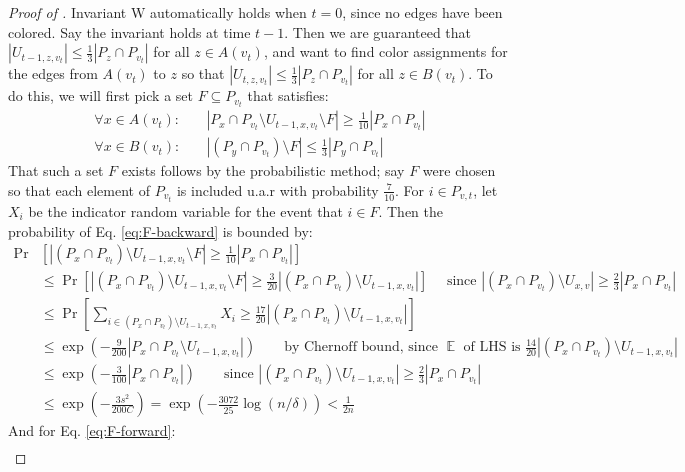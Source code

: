 \documentclass[10pt]{article}
\theoremstyle{definition}\newtheorem{definition}[lemma]{Definition}
\theoremstyle{remark}  \newtheorem*{remark}{Remark}
\DeclareMathOperator{\EE}{\mathbb{E}}
\begin{document}
\begin{proof}[Proof of ]
  Invariant W automatically holds when $t = 0$, since no edges have been colored. Say the invariant holds at time $t - 1$. Then we are guaranteed that $|U_{t-1,z,v_t}| \le \frac{1}{3} |P_z \cap P_{v_t}|$ for all $z \in A(v_t)$, and want to find color assignments for the edges from $A(v_t)$ to $z$ so that $|U_{t,z,v_t}| \le \frac{1}{3} |P_z \cap P_{v_t}|$ for all $z \in B(v_t)$. To do this, we will first pick a set $F \subseteq P_{v_t}$ that satisfies:
  \begin{align}
    \forall x \in A(v_t):&\quad |P_x \cap P_{v_t} \setminus U_{t-1,x,v_t} \setminus F| \ge \frac{1}{10} |P_x \cap P_{v_t}| \label{eq:F-backward} \\
    \forall x \in B(v_t):&\quad |(P_y \cap P_{v_t}) \setminus F| \le \frac{1}{3} |P_y \cap P_{v_t}| \label{eq:F-forward} 
  \end{align}
  That such a set $F$ exists follows by the probabilistic method; say $F$ were chosen so that each element of $P_{v_t}$ is included u.a.r with probability $\frac{7}{10}$. For $i \in P_{v,t}$, let $X_i$ be the indicator random variable for the event that $i \in F$. Then the probability of Eq. \ref{eq:F-backward} is bounded by:
  \begin{align*}
    \Pr&\left[ |(P_x \cap P_{v_t}) \setminus U_{t-1,x,v_t} \setminus F| \ge \frac{1}{10} |P_x \cap P_{v_t}| \right] \\
      &\le   \Pr\left[ |(P_x \cap P_{v_t}) \setminus U_{t-1,x,v_t} \setminus F|      \ge \frac{3}{20} |(P_x \cap P_{v_t}) \setminus U_{t-1,x,v_t}| \right] \quad \text{ since $|(P_x \cap P_{v_t}) \setminus U_{x,v}| \ge \frac{2}{3} |P_x \cap  P_{v_t}|$ } \\
      &\le \Pr\left[ \sum_{i \in (P_x \cap P_{v_t}) \setminus U_{t-1,x,v_t}} X_i \ge \frac{17}{20} |(P_x \cap P_{v_t}) \setminus U_{t-1,x,v_t}| \right] \\
      &\le \exp\left(- \frac{9}{200} |P_x \cap P_{v_t} \setminus U_{t-1,x,v_t}| \right) \qquad \text{by Chernoff bound, since $\EE$ of LHS is $\frac{14}{20} |(P_x \cap P_{v_t}) \setminus U_{t-1,x,v_t}|$} \\
      &\le \exp\left(- \frac{3}{100} |P_x \cap P_{v_t}| \right) \qquad \text{since $|(P_x \cap P_{v_t}) \setminus U_{t-1,x,v_t}| \ge \frac{2}{3} |P_x \cap P_{v_t}|$} \\
      & \le \exp\left(-\frac{3 s^2}{200 C}\right) = \exp\left(- \frac{3072}{25} \log(n/\delta)\right) < \frac{1}{2 n}
  \end{align*}
  And for Eq. \ref{eq:F-forward}:
  \begin{align*}

\end{align*}
\end{proof}
\end{document}
